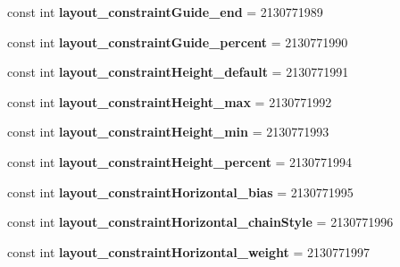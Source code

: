 \begin{DoxyCompactItemize}
const int {\bfseries layout\+\_\+constraint\+Guide\+\_\+end} = 2130771989
\item 
\mbox{\label{classst_delivery_1_1_resource_1_1_attribute_a65165c4caf105248abba0bed910bb246}} 
const int {\bfseries layout\+\_\+constraint\+Guide\+\_\+percent} = 2130771990
\item 
\mbox{\label{classst_delivery_1_1_resource_1_1_attribute_a699963474a9667287eb58d546ea179e5}} 
const int {\bfseries layout\+\_\+constraint\+Height\+\_\+default} = 2130771991
\item 
\mbox{\label{classst_delivery_1_1_resource_1_1_attribute_ae462a7d57c0f960bf9b9b106b4d1a238}} 
const int {\bfseries layout\+\_\+constraint\+Height\+\_\+max} = 2130771992
\item 
\mbox{\label{classst_delivery_1_1_resource_1_1_attribute_aa420c9ff974df1b4f2778dd4dc7f64f1}} 
const int {\bfseries layout\+\_\+constraint\+Height\+\_\+min} = 2130771993
\item 
\mbox{\label{classst_delivery_1_1_resource_1_1_attribute_aab4ab3edca3b6265a3a8fde7f42ea05a}} 
const int {\bfseries layout\+\_\+constraint\+Height\+\_\+percent} = 2130771994
\item 
\mbox{\label{classst_delivery_1_1_resource_1_1_attribute_afde05ebd18828c74e540f17d71462176}} 
const int {\bfseries layout\+\_\+constraint\+Horizontal\+\_\+bias} = 2130771995
\item 
\mbox{\label{classst_delivery_1_1_resource_1_1_attribute_a1143b9189d7fdf284f620fc6d118cad9}} 
const int {\bfseries layout\+\_\+constraint\+Horizontal\+\_\+chain\+Style} = 2130771996
\item 
\mbox{\label{classst_delivery_1_1_resource_1_1_attribute_a1bb212c543324d74aa05e5ee83c0b899}} 
const int {\bfseries layout\+\_\+constraint\+Horizontal\+\_\+weight} = 2130771997
\item 

\end{DoxyCompactItemize}
